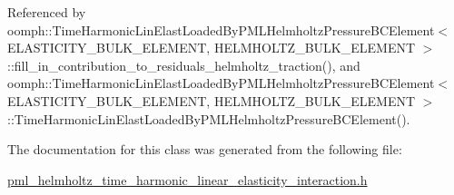 Referenced by oomph\+::\+Time\+Harmonic\+Lin\+Elast\+Loaded\+By\+P\+M\+L\+Helmholtz\+Pressure\+B\+C\+Element$<$ E\+L\+A\+S\+T\+I\+C\+I\+T\+Y\+\_\+\+B\+U\+L\+K\+\_\+\+E\+L\+E\+M\+E\+N\+T, H\+E\+L\+M\+H\+O\+L\+T\+Z\+\_\+\+B\+U\+L\+K\+\_\+\+E\+L\+E\+M\+E\+N\+T $>$\+::fill\+\_\+in\+\_\+contribution\+\_\+to\+\_\+residuals\+\_\+helmholtz\+\_\+traction(), and oomph\+::\+Time\+Harmonic\+Lin\+Elast\+Loaded\+By\+P\+M\+L\+Helmholtz\+Pressure\+B\+C\+Element$<$ E\+L\+A\+S\+T\+I\+C\+I\+T\+Y\+\_\+\+B\+U\+L\+K\+\_\+\+E\+L\+E\+M\+E\+N\+T, H\+E\+L\+M\+H\+O\+L\+T\+Z\+\_\+\+B\+U\+L\+K\+\_\+\+E\+L\+E\+M\+E\+N\+T $>$\+::\+Time\+Harmonic\+Lin\+Elast\+Loaded\+By\+P\+M\+L\+Helmholtz\+Pressure\+B\+C\+Element().



The documentation for this class was generated from the following file\+:\begin{DoxyCompactItemize}
\item 
\hyperlink{pml__helmholtz__time__harmonic__linear__elasticity__interaction_8h}{pml\+\_\+helmholtz\+\_\+time\+\_\+harmonic\+\_\+linear\+\_\+elasticity\+\_\+interaction.\+h}\end{DoxyCompactItemize}
